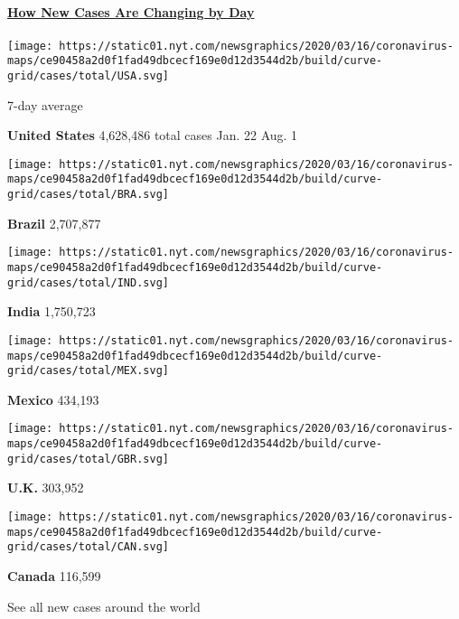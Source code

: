 \subsection{}

\hypertarget{how-new-cases-are-changing-by-day}{%
\paragraph{\texorpdfstring{\href{https://www.nytimes.com/interactive/2020/world/coronavirus-maps.html}{How
New Cases Are Changing by
Day}}{How New Cases Are Changing by Day}}\label{how-new-cases-are-changing-by-day}}

\texttt{[image: https://static01.nyt.com/newsgraphics/2020/03/16/coronavirus-maps/ce90458a2d0f1fad49dbcecf169e0d12d3544d2b/build/curve-grid/cases/total/USA.svg]}

7-day average

\textbf{United States} 4,628,486 total cases Jan. 22 Aug. 1

\texttt{[image: https://static01.nyt.com/newsgraphics/2020/03/16/coronavirus-maps/ce90458a2d0f1fad49dbcecf169e0d12d3544d2b/build/curve-grid/cases/total/BRA.svg]}

\textbf{Brazil} 2,707,877

\texttt{[image: https://static01.nyt.com/newsgraphics/2020/03/16/coronavirus-maps/ce90458a2d0f1fad49dbcecf169e0d12d3544d2b/build/curve-grid/cases/total/IND.svg]}

\textbf{India} 1,750,723

\texttt{[image: https://static01.nyt.com/newsgraphics/2020/03/16/coronavirus-maps/ce90458a2d0f1fad49dbcecf169e0d12d3544d2b/build/curve-grid/cases/total/MEX.svg]}

\textbf{Mexico} 434,193

\texttt{[image: https://static01.nyt.com/newsgraphics/2020/03/16/coronavirus-maps/ce90458a2d0f1fad49dbcecf169e0d12d3544d2b/build/curve-grid/cases/total/GBR.svg]}

\textbf{U.K.} 303,952

\texttt{[image: https://static01.nyt.com/newsgraphics/2020/03/16/coronavirus-maps/ce90458a2d0f1fad49dbcecf169e0d12d3544d2b/build/curve-grid/cases/total/CAN.svg]}

\textbf{Canada} 116,599

\href{https://www.nytimes.com/interactive/2020/world/coronavirus-maps.html}{}

See all new cases around the world

\href{https://www.nytimes.com/2020/08/01/world/coronavirus-covid-19.html}{}

